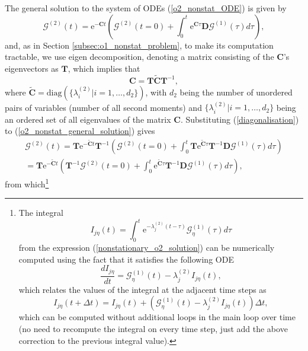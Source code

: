 \documentclass[a4paper, 11pt]{article}
\begin{document}
The general solution to the system of ODEs (\ref{o2_nonstat_ODE}) is given by
\begin{equation} \label{o2_nonstat_general_solution}
  \boldsymbol{\mathcal G}^{(2)}(t) = \mathrm e^{-\mathbf C t}\left(\boldsymbol{\mathcal G}^{(2)}(t=0) + \int_0^t\mathrm e^{\mathbf C\tau}\mathbf D\boldsymbol{\mathcal G}^{(1)}(\tau)d\tau\right),
\end{equation}
and, as in Section \ref{subsec:o1_nonstat_problem}, to make its computation tractable, we use eigen decomposition, denoting a matrix consisting of the $\mathbf C$'s eigenvectors as $\mathbf T$, which implies that
\begin{equation} \label{diagonalisation}
  \mathbf C = \mathbf T \tilde{\mathbf C} \mathbf T^{-1},
\end{equation}
where $\tilde{\mathbf C} = \text{diag}(\{\lambda^{(2)}_i|i=1,\dots,d_2\})$, with $d_2$ being the number of unordered pairs of variables (number of all second moments) and $\{\lambda^{(2)}_i|i=1,\dots,d_2\}$ being an ordered set of all eigenvalues of the matrix $\mathbf C$. Substituting (\ref{diagonalisation}) to (\ref{o2_nonstat_general_solution}) gives
\begin{multline} \label{nonstationary_o2_solution}
  \boldsymbol{\mathcal G}^{(2)}(t) = \mathbf T\mathrm e^{-\tilde{\mathbf C}t}\mathbf T^{-1}\left(\boldsymbol{\mathcal G}^{(2)}(t=0) + \int_0^t\mathbf T\mathrm e^{\tilde{\mathbf C}\tau}\mathbf T^{-1}\mathbf D\boldsymbol{\mathcal G}^{(1)}(\tau)d\tau\right)\\
  = \mathbf T\mathrm e^{-\tilde{\mathbf C}t}\left(\mathbf T^{-1}\boldsymbol{\mathcal G}^{(2)}(t=0) + \int_0^t\mathrm e^{\tilde{\mathbf C}\tau}\mathbf T^{-1}\mathbf D\boldsymbol{\mathcal G}^{(1)}(\tau)d\tau\right),
\end{multline}
from which\footnote{The integral
\begin{equation}
  I_{j\eta}(t) = \int_0^t\mathrm e^{-\lambda^{(2)}_j(t-\tau)}\mathcal G^{(1)}_\eta(\tau)d\tau
\end{equation}
from the expression (\ref{nonstationary_o2_solution}) can be numerically computed using the fact that it satisfies the following ODE
\begin{equation*}
  \frac{dI_{j\eta}}{dt} = \mathcal G^{(1)}_\eta(t) - \lambda_j^{(2)}I_{j\eta}(t),
\end{equation*}
which relates the values of the integral at the adjacent time steps as
\begin{equation*}
  I_{j\eta}(t+\Delta t) = I_{j\eta}(t) + \left(\mathcal G^{(1)}_\eta(t) - \lambda^{(2)}_jI_{j\eta}(t)\right)\Delta t,
\end{equation*}
which can be computed without additional loops in the main loop over time (no need to recompute the integral on every time step, just add the above correction to the previous integral value).
}
\end{document}

